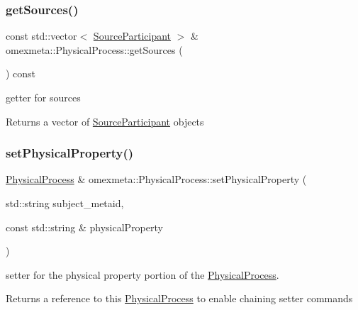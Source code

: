 \subsubsection{\texorpdfstring{get\+Sources()}{getSources()}}
{\footnotesize\ttfamily const std\+::vector$<$ \hyperlink{classomexmeta_1_1SourceParticipant}{Source\+Participant} $>$ \& omexmeta\+::\+Physical\+Process\+::get\+Sources (\begin{DoxyParamCaption}{ }\end{DoxyParamCaption}) const}



getter for sources 

\begin{DoxyReturn}{Returns}
a vector of \hyperlink{classomexmeta_1_1SourceParticipant}{Source\+Participant} objects 
\end{DoxyReturn}
\mbox{\label{classomexmeta_1_1PhysicalProcess_ac875058d67408246aa28cf58dd77ccf6}} 
\subsubsection{\texorpdfstring{set\+Physical\+Property()}{setPhysicalProperty()}\hspace{0.1cm}{\footnotesize\ttfamily [1/2]}}
{\footnotesize\ttfamily \hyperlink{classomexmeta_1_1PhysicalProcess}{Physical\+Process} \& omexmeta\+::\+Physical\+Process\+::set\+Physical\+Property (\begin{DoxyParamCaption}\item[{std\+::string}]{subject\+\_\+metaid,  }\item[{const std\+::string \&}]{physical\+Property }\end{DoxyParamCaption})}



setter for the physical property portion of the \hyperlink{classomexmeta_1_1PhysicalProcess}{Physical\+Process}. 

\begin{DoxyReturn}{Returns}
a reference to this \hyperlink{classomexmeta_1_1PhysicalProcess}{Physical\+Process} to enable chaining setter commands 
\end{DoxyReturn}
\mbox{\label{classomexmeta_1_1PhysicalProcess_ac49bf4a1c21c6590a9d2af7ae93e13a7}} 
